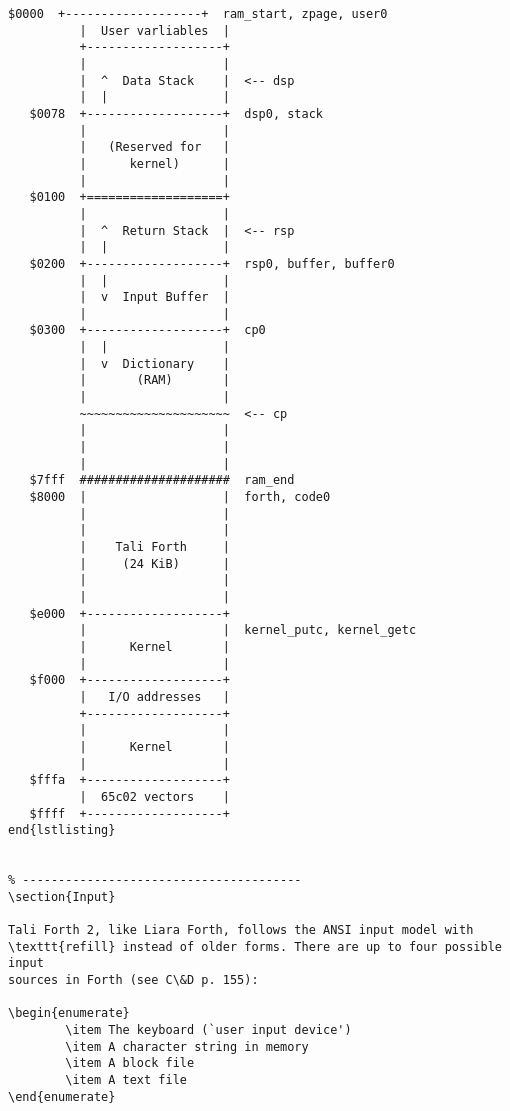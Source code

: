 \begin{lstlisting}[frame=single]
   $0000  +-------------------+  ram_start, zpage, user0
          |  User varliables  |
          +-------------------+  
          |                   |
          |  ^  Data Stack    |  <-- dsp
          |  |                |
   $0078  +-------------------+  dsp0, stack
          |                   |
          |   (Reserved for   |
          |      kernel)      |
          |                   |
   $0100  +===================+  
          |                   |
          |  ^  Return Stack  |  <-- rsp 
          |  |                |
   $0200  +-------------------+  rsp0, buffer, buffer0
          |  |                |
          |  v  Input Buffer  |
          |                   |
   $0300  +-------------------+  cp0
          |  |                |
          |  v  Dictionary    |
          |       (RAM)       |
          |                   |
          ~~~~~~~~~~~~~~~~~~~~~  <-- cp
          |                   |
          |                   |
          |                   |
   $7fff  #####################  ram_end
   $8000  |                   |  forth, code0
          |                   |
          |                   |
          |    Tali Forth     |
          |     (24 KiB)      |
          |                   |
          |                   |
   $e000  +-------------------+
          |                   |  kernel_putc, kernel_getc   
          |      Kernel       |
          |                   |
   $f000  +-------------------+  
          |   I/O addresses   |
          +-------------------+     
          |                   |
          |      Kernel       |
          |                   |
   $fffa  +-------------------+     
          |  65c02 vectors    |
   $ffff  +-------------------+     
end{lstlisting}


% ---------------------------------------
\section{Input}

Tali Forth 2, like Liara Forth, follows the ANSI input model with
\texttt{refill} instead of older forms. There are up to four possible input
sources in Forth (see C\&D p. 155):

\begin{enumerate}
        \item The keyboard (`user input device')
        \item A character string in memory
        \item A block file
        \item A text file
\end{enumerate}


\end{lstlisting}
